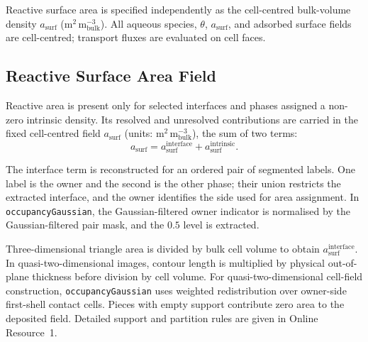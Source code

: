 Reactive surface area is specified independently as the cell-centred bulk-volume
density $a_{\mathrm{surf}}$ (m$^2$\,m$^{-3}_{\mathrm{bulk}}$). All aqueous
species, $\theta$, $a_{\mathrm{surf}}$, and adsorbed surface fields are
cell-centred; transport fluxes are evaluated on cell faces.

\subsection{Reactive Surface Area Field}
\label{sec:aSurf}

Reactive area is present only for selected interfaces and phases assigned a
non-zero intrinsic density. Its resolved and unresolved contributions are
carried in the fixed cell-centred field $a_{\mathrm{surf}}$ (units:
m$^2\,\mathrm{m}^{-3}_{\mathrm{bulk}}$), the sum of two terms:
\begin{equation}
a_{\mathrm{surf}} = a_{\mathrm{surf}}^{\mathrm{interface}} +
a_{\mathrm{surf}}^{\mathrm{intrinsic}}.
\label{eq:asurf}
\end{equation}

The interface term is reconstructed for an ordered pair of segmented labels.
One label is the owner and the second is the other phase; their union restricts
the extracted interface, and the owner identifies the side used for area
assignment. In \texttt{occupancyGaussian}, the Gaussian-filtered owner
indicator is normalised by the Gaussian-filtered pair mask, and the $0.5$
level is extracted.

Three-dimensional triangle area is divided by bulk cell volume to obtain
$a_{\mathrm{surf}}^{\mathrm{interface}}$. In quasi-two-dimensional images,
contour length is multiplied by physical out-of-plane thickness before
division by cell volume. For quasi-two-dimensional cell-field construction,
\texttt{occupancyGaussian} uses weighted redistribution over owner-side
first-shell contact cells. Pieces with empty support contribute zero area
to the deposited field. Detailed support and partition rules are given in
Online Resource~1.

